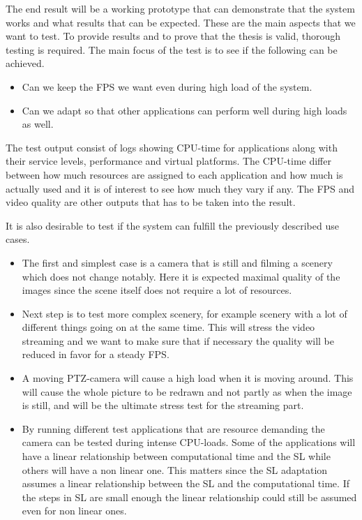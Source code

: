 \documentclass[nobiblatex]{LTHthesis}
\begin{document}
The end result will be a working prototype that can demonstrate that the system works and what results that can be expected. These are the main aspects that we want to test.
To provide results and to prove that the thesis is valid, thorough testing is required. The main focus of the test is to see if the following can be achieved.
\begin{itemize}
\item Can we keep the FPS we want even during high load of the system.
\item Can we adapt so that other applications can perform well during high loads as well. 
\end{itemize}

The test output consist of logs showing CPU-time for applications along with their service levels, performance and virtual platforms. The CPU-time differ between how much resources are assigned to each application and how much is actually used and it is of interest to see how much they vary if any. The FPS and video quality are other outputs that has to be taken into the result.

It is also desirable to test if the system can fulfill the previously described use cases.

\begin{itemize}

\item The first and simplest case is a camera that is still and filming a scenery which does not change notably. Here it is expected maximal quality of the images since the scene itself does not require a lot of resources. 
\item Next step is to test more complex scenery, for example scenery with a lot of different things going on at the same time. This will stress the video streaming and we want to make sure that if necessary the quality will be reduced in favor for a steady FPS.
\item A moving PTZ-camera will cause a high load when it is moving around. This will cause the whole picture to be redrawn and not partly as when the image is still, and will be the ultimate stress test for the streaming part.
\item By running different test applications that are resource demanding the camera can be tested during intense CPU-loads. Some of the applications will have a linear relationship between computational time and the SL while others will have a non linear one. This matters since the SL adaptation assumes a linear relationship between the SL and the computational time. If the steps in SL are small enough the linear relationship could still be assumed even for non linear ones.
\end{itemize}
\end{document}
